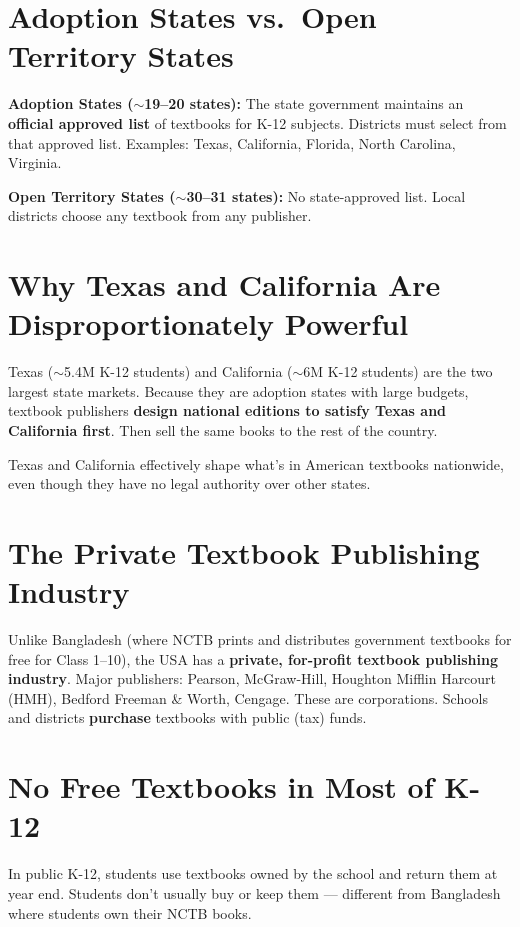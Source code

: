\section{Adoption States vs.\ Open Territory States}

\textbf{Adoption States ($\sim$19--20 states):} The state government maintains an \textbf{official approved list} of textbooks for K-12 subjects. Districts must select from that approved list. Examples: Texas, California, Florida, North Carolina, Virginia.

\textbf{Open Territory States ($\sim$30--31 states):} No state-approved list. Local districts choose any textbook from any publisher.

\section{Why Texas and California Are Disproportionately Powerful}

Texas ($\sim$5.4M K-12 students) and California ($\sim$6M K-12 students) are the two largest state markets. Because they are adoption states with large budgets, textbook publishers \textbf{design national editions to satisfy Texas and California first}. Then sell the same books to the rest of the country.

Texas and California effectively shape what's in American textbooks nationwide, even though they have no legal authority over other states.

\section{The Private Textbook Publishing Industry}

Unlike Bangladesh (where NCTB prints and distributes government textbooks for free for Class 1--10), the USA has a \textbf{private, for-profit textbook publishing industry}. Major publishers: Pearson, McGraw-Hill, Houghton Mifflin Harcourt (HMH), Bedford Freeman \& Worth, Cengage. These are corporations. Schools and districts \textbf{purchase} textbooks with public (tax) funds.

\section{No Free Textbooks in Most of K-12}

In public K-12, students use textbooks owned by the school and return them at year end. Students don't usually buy or keep them --- different from Bangladesh where students own their NCTB books.


